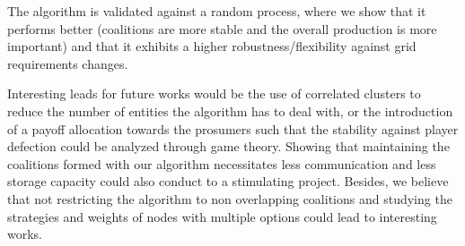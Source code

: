 \documentclass[conference]{IEEEtran}
\begin{document}
The algorithm is validated against a random process, where we show that it performs better (coalitions are more stable and the overall production is more important) and that it exhibits a higher robustness/flexibility against grid requirements changes.

Interesting leads for future works would be the use of correlated clusters to reduce the number of entities the algorithm has to deal with, or the introduction of a payoff allocation towards the prosumers such that the stability against player defection could be analyzed through game theory. Showing that maintaining the coalitions formed with our algorithm necessitates less communication and less storage capacity could also conduct to a stimulating project. Besides, we believe that not restricting the algorithm to non overlapping coalitions and studying the strategies and weights of nodes with multiple options could lead to interesting works.



%
%
 
  

\end{document}
